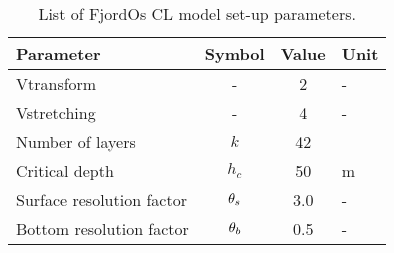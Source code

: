\begin{table}[h]
 \begin{center}
  \caption{List of FjordOs CL model set-up parameters.}
   \begin{tabular}{lccl}
   \hline
    Parameter				& Symbol	& Value	& Unit		\\
   \hline
    Vtransform				& -		& 2 	& -		\\
    Vstretching 			& -		& 4	& -		\\
    Number of layers			& $k$ 		& 42 \\
    Critical depth			& $h_c$		& 50	& m		\\
    Surface resolution factor		& $\theta_s$	& 3.0	& -		\\
    Bottom resolution factor		& $\theta_b$	& 0.5	& -		\\
   \hline
   \end{tabular}
  \label{tab:parameters}
 \end{center}
\end{table} 

